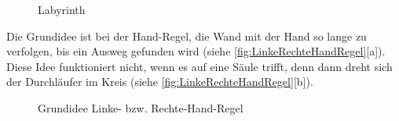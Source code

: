 \begin{figure}[h]
  \centering
  \qquad
  \caption{Labyrinth}
  \label{fig:Labyrinth}
\end{figure}

Die Grundidee ist bei der Hand-Regel, die Wand mit der Hand so lange zu verfolgen, bis ein Ausweg gefunden wird (siehe \autoref{fig:LinkeRechteHandRegel}[a]). Diese Idee funktioniert nicht, wenn es auf eine Säule trifft, denn dann dreht sich der Durchläufer im Kreis (siehe \autoref{fig:LinkeRechteHandRegel}[b]).
\begin{figure}[H]
  \centering
  \qquad
  \caption{Grundidee Linke- bzw. Rechte-Hand-Regel}
  \label{fig:LinkeRechteHandRegel}
\end{figure}


